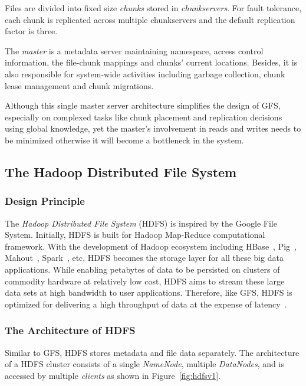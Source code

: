 \noindent Files are divided into fixed size \textit{chunks} stored in \textit{chunkservers}. For fault tolerance, each chunk is replicated across multiple chunkservers and the default replication factor is three.

\noindent The \textit{master} is a metadata server maintaining namespace, access control information, the file-chunk mappings and chunks' current locations. Besides, it is also responsible for system-wide activities including garbage collection, chunk lease management and chunk migrations.

\noindent Although this single master server architecture simplifies the design of GFS, especially on complexed tasks like chunk placement and replication decisions using global knowledge, yet the master's involvement in reads and writes needs to be minimized otherwise it will become a bottleneck in the system.

\subsection{The Hadoop Distributed File System}

\subsubsection{Design Principle}
The \textit{Hadoop Distributed File System} (HDFS) is inspired by the Google File System. Initially, HDFS is built for Hadoop Map-Reduce computational framework. With the development of Hadoop ecosystem including HBase~\cite{apachehbase}, Pig~\cite{apachepig}, Mahout~\cite{apachemahout}, Spark~\cite{apachespark}, etc, HDFS becomes the storage layer for all these big data applications. While enabling petabytes of data to be persisted on clusters of commodity hardware at relatively low cost, HDFS aims to stream these large data sets at high bandwidth to user applications. Therefore, like GFS, HDFS is optimized for delivering a high throughput of data at the expense of latency~\cite{white2012hadoop}.

\subsubsection{The Architecture of HDFS}
\noindent Similar to GFS, HDFS stores metadata and file data separately. The architecture of a HDFS cluster consists of a single \textit{NameNode}, multiple \textit{DataNodes}, and is accessed by multiple \textit{clients} as shown in Figure~\ref{fig:hdfsv1}.

